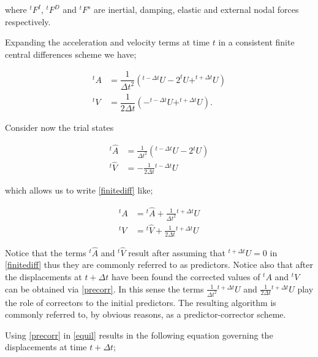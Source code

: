 \documentclass[12pt,letterpaper]{article}
\begin{document}
where $^{t}F^I$, $^{t}F^D$ and $^{t}F^s$ are inertial, damping, elastic and external nodal forces respectively.

Expanding the acceleration and velocity terms at time $t$ in a consistent finite central differences scheme we have;

\begin{equation}
\begin{aligned}
^{t}A&=\dfrac{1}{\Delta t^2}\left(^{t-\Delta t}U-2^{t}U+^{t+\Delta t}U\right)\\
^{t}V&=\dfrac{1}{2\Delta t}\left(-^{t-\Delta t}U+^{t+\Delta t}U\right).
\end{aligned}
\label{finitediff}
\end{equation}

Consider now the trial states


\begin{equation}
\begin{aligned}
{}^t\hat A & = \frac{1}{{\Delta {t^2}}}\left( {{}^{t - \Delta t}U - 2{}^tU} \right)\\
{}^t\hat V & =  - \frac{1}{{2\Delta t}}{}^{t - \Delta t}U
\end{aligned}
\label{pred}
\end{equation}


which allows us to write \cref{finitediff} like;

\begin{equation}
\begin{aligned}
{}^tA & = {}^t\hat A + \frac{1}{{\Delta {t^2}}}{}^{t + \Delta t}U\\
{}^tV & = {}^t\hat V + \frac{1}{{2\Delta t}}{}^{t + \Delta t}U
\end{aligned}
\label{precorr}
\end{equation}

Notice that the terms ${}^t\hat A$ and ${}^t\hat V$ result after assuming that $^{t+\Delta t}U = 0$ in \cref{finitediff} thus they are commonly referred to as predictors. Notice also that after the displacements at $t+\Delta t$ have been found the corrected values of $^{t}A$ and $^{t}V$ can be obtained via \cref{precorr}. In this sense the terms $\frac{1}{{\Delta {t^2}}}{}^{t + \Delta t}U$ and $\frac{1}{{2\Delta t}}{}^{t + \Delta t}U$ play the role of correctors to the initial predictors. The resulting algorithm is commonly referred to, by obvious reasons, as a predictor-corrector scheme.

Using \cref{precorr} in \cref{equil} results in the following equation governing the displacements at time $t+\Delta t$;
\end{document}
